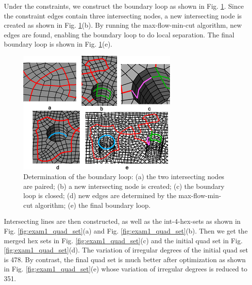 \documentclass[final,5p,times,twocolumn]{elsarticle}
\begin{document}
Under the constraints, we construct the boundary loop as shown in Fig. \ref{fig:exam1_bound_loop}. Since the constraint edges contain three intersecting nodes, a new intersecting node is created as shown in Fig. \ref{fig:exam1_bound_loop}(b). By running the max-flow-min-cut algorithm, new edges are found, enabling the boundary loop to do local separation. The final boundary loop is shown in Fig. \ref{fig:exam1_bound_loop}(e).

\begin{figure}[htbp]
\begin{center}
\includegraphics[width=8cm]{exam1_bound_loop.png}
\caption{Determination of the boundary loop: (a) the two intersecting nodes are paired; (b) a new intersecting node is created; (c) the boundary loop is closed; (d) new edges are determined by the max-flow-min-cut algorithm; (e) the final boundary loop.}
\label{fig:exam1_bound_loop}
\end{center}
\end{figure}

Intersecting lines are then constructed, as well as the int-4-hex-sets as shown in Fig. \ref{fig:exam1_quad_set}(a) and Fig. \ref{fig:exam1_quad_set}(b). Then we get the merged hex sets in Fig. \ref{fig:exam1_quad_set}(c) and the initial quad set in Fig. \ref{fig:exam1_quad_set}(d). The variation of irregular degrees of the initial quad set is 478. By contrast, the final quad set is much better after optimization as shown in Fig. \ref{fig:exam1_quad_set}(e) whose variation of irregular degrees is reduced to 351.
\end{document}
